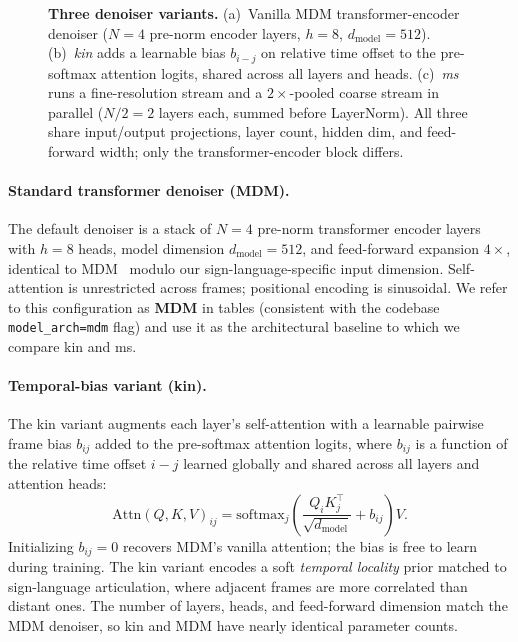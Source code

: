 \documentclass{article}
\begin{document}
\begin{figure}[t]
\caption{\textbf{Three denoiser variants.} (a)~Vanilla MDM transformer-encoder denoiser ($N{=}4$ pre-norm encoder layers, $h{=}8$, $d_{\text{model}}{=}512$). (b)~\emph{kin} adds a learnable bias $b_{i-j}$ on relative time offset to the pre-softmax attention logits, shared across all layers and heads. (c)~\emph{ms} runs a fine-resolution stream and a $2{\times}$-pooled coarse stream in parallel ($N/2{=}2$ layers each, summed before LayerNorm). All three share input/output projections, layer count, hidden dim, and feed-forward width; only the transformer-encoder block differs.}
\label{fig:denoisers}
\end{figure}

\paragraph{Standard transformer denoiser (MDM).}
The default denoiser is a stack of $N{=}4$ pre-norm transformer encoder layers with $h{=}8$ heads, model dimension $d_{\text{model}}{=}512$, and feed-forward expansion $4\times$, identical to MDM~\citep{tevet2023human} modulo our sign-language-specific input dimension. Self-attention is unrestricted across frames; positional encoding is sinusoidal. We refer to this configuration as \textbf{MDM} in tables (consistent with the codebase \texttt{model\_arch=mdm} flag) and use it as the architectural baseline to which we compare kin and ms.

\paragraph{Temporal-bias variant (kin).}
The kin variant augments each layer's self-attention with a learnable pairwise frame bias $b_{ij}$ added to the pre-softmax attention logits, where $b_{ij}$ is a function of the relative time offset $i{-}j$ learned globally and shared across all layers and attention heads:
\begin{equation}
    \text{Attn}(Q,K,V)_{ij} = \text{softmax}_j\!\left(\frac{Q_i K_j^\top}{\sqrt{d_{\text{model}}}} + b_{ij}\right) V.
\end{equation}
Initializing $b_{ij}{=}0$ recovers MDM's vanilla attention; the bias is free to learn during training. The kin variant encodes a soft \emph{temporal locality} prior matched to sign-language articulation, where adjacent frames are more correlated than distant ones. The number of layers, heads, and feed-forward dimension match the MDM denoiser, so kin and MDM have nearly identical parameter counts.
\end{document}
